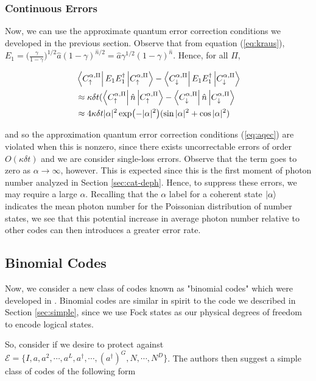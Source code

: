 \documentclass[12]{amsart}
\newcommand\0{\mathbf{0}}
\newcommand\<{\langle}
\renewcommand\>{\rangle}
\begin{document}
\subsubsection{Continuous Errors}

Now, we can use the approximate quantum error correction conditions we developed in the previous section. Observe that from equation (\ref{eq:kraus}), $E_1 = \Big(\frac{\gamma}{1-\gamma}\Big)^{1 / 2} \hat{a} (1 - \gamma)^{\hat{n} / 2} = \hat{a} \gamma^{1/2} (1- \gamma)^{\hat{n}}$. Hence, for all $\Pi$,

\begin{align*}
&\bra{C^{\alpha, \Pi}_{\uparrow}}E_1E_1^\dag\ket{C^{\alpha, \Pi}_{\uparrow}} - \bra{C^{\alpha, \Pi}_{\downarrow}}	E_1E_1^\dag\ket{C^{\alpha, \Pi}_{\downarrow}}	\\
&\approx \kappa\delta t (\bra{C^{\alpha, \Pi}_{\uparrow}}\hat{n}\ket{C^{\alpha, \Pi}_{\uparrow}} - \bra{C^{\alpha, \Pi}_{\downarrow}}	\hat{n}\ket{C^{\alpha, \Pi}_{\downarrow}}\\
&\approx 4 \kappa \delta t |\alpha|^2  \exp(-|\alpha|^2)(\sin |\alpha|^2 + \cos|\alpha|^2)
\end{align*}

and so the approximation quantum error correction conditions (\ref{eq:aqec}) are violated when this is nonzero, since there exists uncorrectable errors of order $O(\kappa \delta t)$ and we are consider single-loss errors. Observe that the term goes to zero as $\alpha\rightarrow \infty$, however. This is expected since this is the first moment of photon number analyzed in Section \ref{sec:cat-deph}. Hence, to suppress these errors, we may require a large $\alpha$. Recalling that the $\alpha$ label for a coherent state $\ket{\alpha}$ indicates the mean photon number for the Poissonian distribution of number states, we see that this potential increase in average photon number relative to other codes can then introduces a greater error rate.

\subsection{Binomial Codes}

Now, we consider a new class of codes known as "binomial codes" which were developed in  \cite{michael2016new}. Binomial codes are similar in spirit to the code we described in Section \ref{sec:simple}, since we use Fock states as our physical degrees of freedom to encode logical states.


So, consider if we desire to protect against $\mathcal{E} = \{I, a, a^2, \cdots, a^L, a^\dag, \cdots, (a^\dag)^G, N, \cdots, N^D \}$. The authors then suggest a simple class of codes of the following form
\end{document}
